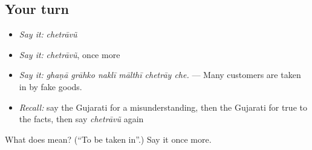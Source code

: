 \subsection*{Your turn}
\begin{itemize}
\raggedright
  \item \emph{Say it:} \emph{chetrāvũ}
  \item \emph{Say it:} \emph{chetrāvũ}, once more
  \item \emph{Say it:} \emph{ghaṇā grāhko naklī mālthī chetrāy che.} — Many customers are taken in by fake goods.
  \item \emph{Recall:} say the Gujarati for a misunderstanding, then the Gujarati for true to the facts, then say \emph{chetrāvũ} again
\end{itemize}

\begin{tcolorbox}[breakable,colback=teal!4,colframe=teal!35!black,title={Before you move on}]
What does  mean? (\textquotedblleft{}To be taken in\textquotedblright{}.) Say it once more.
\end{tcolorbox}
